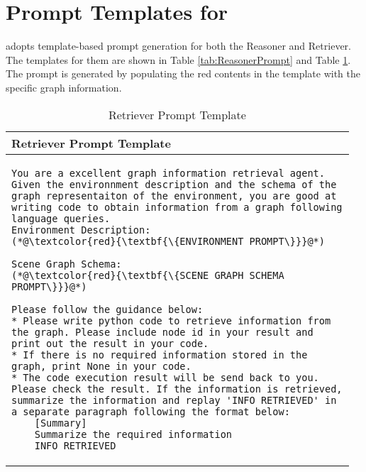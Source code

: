 
\section{Prompt Templates for \RwR}
\label{app:PromptTemplate}
\RwR adopts template-based prompt generation for both the Reasoner and Retriever. The templates for them are shown in Table \ref{tab:ReasonerPrompt} and Table \ref{tab:RetrieverPrompt}. The prompt is generated by populating the red contents in the template with the specific graph information.


\begin{longtable}{|p{0.96\linewidth}|}
    \caption{Retriever Prompt Template}
    \label{tab:RetrieverPrompt} \\
    \hline
    \textbf{Retriever Prompt Template} \\
    \hline
    \endfirsthead
    \hline
    \endhead
    \hline
    \endfoot

    \begin{lstlisting}[style=prompt]
You are a excellent graph information retrieval agent. Given the environnment description and the schema of the graph representaiton of the environment, you are good at writing code to obtain information from a graph following language queries.
Environment Description:
(*@\textcolor{red}{\textbf{\{ENVIRONMENT PROMPT\}}}@*)

Scene Graph Schema:
(*@\textcolor{red}{\textbf{\{SCENE GRAPH SCHEMA PROMPT\}}}@*)

Please follow the guidance below:
* Please write python code to retrieve information from the graph. Please include node id in your result and print out the result in your code.
* If there is no required information stored in the graph, print None in your code.
* The code execution result will be send back to you. Please check the result. If the information is retrieved, summarize the information and replay 'INFO RETRIEVED' in a separate paragraph following the format below:
    [Summary]
    Summarize the required information
    INFO RETRIEVED
\end{lstlisting}
\\
\end{longtable}



